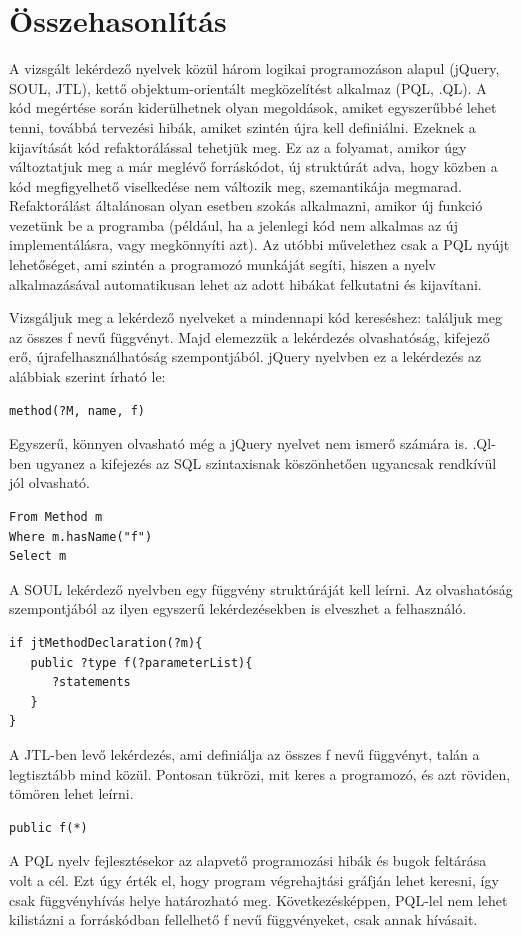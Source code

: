 \documentclass[a4paper,12pt]{report}
\begin{document}
\section{Összehasonlítás}
\par A vizsgált lekérdező nyelvek közül három logikai programozáson alapul (jQuery, SOUL, JTL), kettő objektum-orientált megközelítést alkalmaz (PQL, .QL). A kód megértése során kiderülhetnek olyan megoldások, amiket egyszerűbbé lehet tenni, továbbá tervezési hibák, amiket szintén újra kell definiálni. Ezeknek a kijavítását kód refaktorálással tehetjük meg. Ez az a folyamat, amikor úgy változtatjuk meg a már meglévő forráskódot, új struktúrát adva, hogy közben a kód megfigyelhető viselkedése nem változik meg, szemantikája megmarad. Refaktorálást általánosan olyan esetben szokás alkalmazni, amikor új funkció vezetünk be a programba (például, ha a jelenlegi kód nem alkalmas az új implementálásra, vagy megkönnyíti azt). Az utóbbi művelethez csak a PQL nyújt lehetőséget, ami szintén a programozó munkáját segíti, hiszen a nyelv alkalmazásával automatikusan lehet az adott hibákat felkutatni és kijavítani.
\par Vizsgáljuk meg a lekérdező nyelveket a mindennapi kód kereséshez: találjuk meg az összes f nevű függvényt. Majd elemezzük a lekérdezés olvashatóság, kifejező erő, újrafelhasználhatóság szempontjából. 
jQuery nyelvben ez a lekérdezés az alábbiak szerint írható le:
\begin{verbatim}
method(?M, name, f)
\end{verbatim}
Egyszerű, könnyen olvasható még a jQuery nyelvet nem ismerő számára is.
.Ql-ben ugyanez a kifejezés az SQL szintaxisnak köszönhetően ugyancsak rendkívül jól olvasható.
\begin{verbatim}
From Method m
Where m.hasName("f")
Select m
\end{verbatim}
A SOUL lekérdező nyelvben egy függvény struktúráját kell leírni. Az olvashatóság szempontjából az ilyen egyszerű lekérdezésekben is elveszhet a felhasználó. 
\begin{verbatim}
if jtMethodDeclaration(?m){
   public ?type f(?parameterList){
      ?statements
   }
}
\end{verbatim}
A JTL-ben levő lekérdezés, ami definiálja az összes f nevű függvényt, talán a legtisztább mind közül. Pontosan tükrözi, mit keres a programozó, és azt röviden, tömören lehet leírni.
\begin{verbatim}
public f(*)
\end{verbatim}
A PQL nyelv fejlesztésekor az alapvető programozási hibák és bugok feltárása volt a cél. Ezt úgy érték el, hogy program végrehajtási gráfján lehet keresni, így csak függvényhívás helye határozható meg. Következésképpen, PQL-lel nem lehet kilistázni a forráskódban fellelhető f nevű függvényeket, csak annak hívásait.
\end{document}

